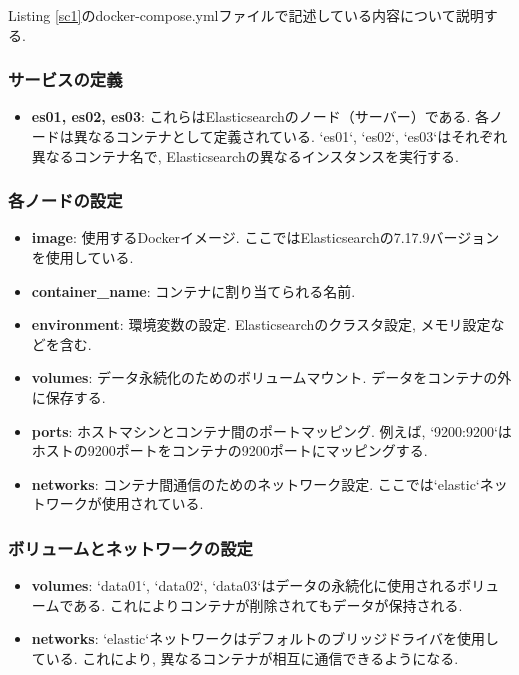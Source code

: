 \documentclass[a4j,12pt,]{jarticle}
\begin{document}
Listing \ref{sc1}のdocker-compose.ymlファイルで記述している内容について説明する.

\subsubsection*{サービスの定義}
\begin{itemize}
  \item \textbf{es01, es02, es03}: これらはElasticsearchのノード（サーバー）である. 各ノードは異なるコンテナとして定義されている. `es01`, `es02`, `es03`はそれぞれ異なるコンテナ名で, Elasticsearchの異なるインスタンスを実行する.
\end{itemize}

\subsubsection*{各ノードの設定}
\begin{itemize}
  \item \textbf{image}: 使用するDockerイメージ. ここではElasticsearchの7.17.9バージョンを使用している.
  \item \textbf{container\_name}: コンテナに割り当てられる名前.
  \item \textbf{environment}: 環境変数の設定. Elasticsearchのクラスタ設定, メモリ設定などを含む.
  \item \textbf{volumes}: データ永続化のためのボリュームマウント. データをコンテナの外に保存する.
  \item \textbf{ports}: ホストマシンとコンテナ間のポートマッピング. 例えば, `9200:9200`はホストの9200ポートをコンテナの9200ポートにマッピングする.
  \item \textbf{networks}: コンテナ間通信のためのネットワーク設定. ここでは`elastic`ネットワークが使用されている.
\end{itemize}

\subsubsection*{ボリュームとネットワークの設定}
\begin{itemize}
  \item \textbf{volumes}: `data01`, `data02`, `data03`はデータの永続化に使用されるボリュームである. これによりコンテナが削除されてもデータが保持される.
  \item \textbf{networks}: `elastic`ネットワークはデフォルトのブリッジドライバを使用している. これにより, 異なるコンテナが相互に通信できるようになる.
\end{itemize}
\end{document}
